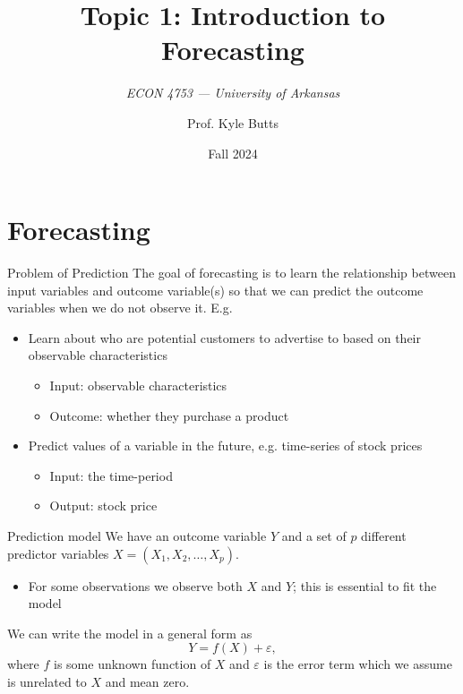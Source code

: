 \documentclass[aspectratio=169,t,11pt,table]{beamer}
\title{Topic 1: Introduction to Forecasting}
\subtitle{\it  ECON 4753 — University of Arkansas}
\date{Fall 2024}
\author{Prof. Kyle Butts}
\begin{document}
\begin{frame}
\maketitle

\end{frame}


\section{Forecasting}

\begin{frame}{Problem of Prediction}
  The goal of forecasting is to learn the relationship between \alert{input variables} and \alert{outcome variable(s)} so that we can \alert{predict} the outcome variables when we do not observe it. 
  \pause E.g.
  \begin{itemize}
    \item Learn about who are potential customers to advertise to based on their observable characteristics
    \begin{itemize}
      \item Input: observable characteristics
      \item Outcome: whether they purchase a product
    \end{itemize}
    
    \pause
    \item Predict values of a variable in the future, e.g. \alert{time-series} of stock prices
    \begin{itemize}
      \item Input: the time-period
      \item Output: stock price
    \end{itemize}
  \end{itemize}  
\end{frame}

\begin{frame}{Prediction model}
  We have an outcome variable $Y$ and a set of $p$ different predictor variables $X = (X_1, X_2, \dots, X_p)$. 
  \begin{itemize}
    \item For some observations we observe both $X$ and $Y$; this is essential to \alert{fit} the model
  \end{itemize}

  \bigskip
  We can write the model in a general form as
  $$
    Y = f(X) + \varepsilon,
  $$
  where $f$ is some unknown function of $X$ and $\varepsilon$ is the \alert{error term} which we assume is unrelated to $X$ and mean zero.
\end{frame}
\end{document}
